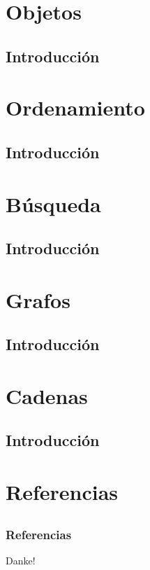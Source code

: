 \documentclass{beamer}
\begin{document}
\section{Objetos}
\subsection{Introducci\'on}

\section{Ordenamiento}
\subsection{Introducci\'on}

\section{B\'usqueda}
\subsection{Introducci\'on}

\section{Grafos}
\subsection{Introducci\'on}

\section{Cadenas}
\subsection{Introducci\'on}

\section{Referencias}
\subsection{}
\begin{frame}[allowframebreaks]
    
    \frametitle{Referencias}
    
    
\end{frame}

\begin{frame}
    \begin{center}
        {\Huge\calligra Danke!}
    \end{center}
\end{frame}
\end{document}
